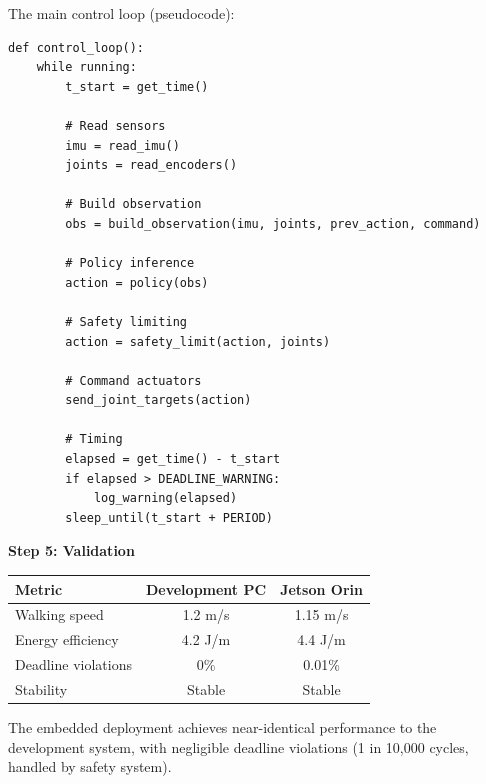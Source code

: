 \begin{example}
The main control loop (pseudocode):
\begin{verbatim}
def control_loop():
    while running:
        t_start = get_time()

        # Read sensors
        imu = read_imu()
        joints = read_encoders()

        # Build observation
        obs = build_observation(imu, joints, prev_action, command)

        # Policy inference
        action = policy(obs)

        # Safety limiting
        action = safety_limit(action, joints)

        # Command actuators
        send_joint_targets(action)

        # Timing
        elapsed = get_time() - t_start
        if elapsed > DEADLINE_WARNING:
            log_warning(elapsed)
        sleep_until(t_start + PERIOD)
\end{verbatim}

\textbf{Step 5: Validation}

\begin{center}
\begin{tabular}{lcc}
\toprule
\textbf{Metric} & \textbf{Development PC} & \textbf{Jetson Orin} \\
\midrule
Walking speed & 1.2 m/s & 1.15 m/s \\
Energy efficiency & 4.2 J/m & 4.4 J/m \\
Deadline violations & 0\% & 0.01\% \\
Stability & Stable & Stable \\
\bottomrule
\end{tabular}
\end{center}

The embedded deployment achieves near-identical performance to the development system, with negligible deadline violations (1 in 10,000 cycles, handled by safety system).
\end{example}

